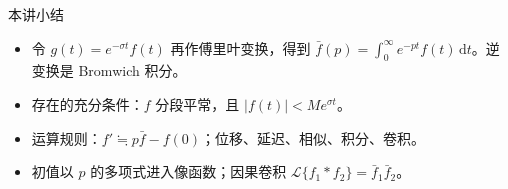 \documentclass[fontset=windows, chinese, 10pt, xcolor=dvipsnames]{beamer}
\begin{document}

\begin{frame}{本讲小结}
  \begin{itemize}
    \item 令 $g(t)=e^{-\sigma t}f(t)$ 再作傅里叶变换，得到
      $\bar f(p)=\int_0^{\infty} e^{-pt}f(t)\,\mathrm{d}t$。逆变换是 Bromwich 积分。
    \item 存在的充分条件：$f$ 分段平常，且 $|f(t)|<M e^{\sigma t}$。
    \item 运算规则：$f'\fallingdotseq p\bar f-f(0)$；位移、延迟、相似、积分、卷积。
    \item 初值以 $p$ 的多项式进入像函数；因果卷积 $\mathcal{L}\{f_1*f_2\}=\bar f_1\bar f_2$。
  \end{itemize}
\end{frame}
\end{document}
